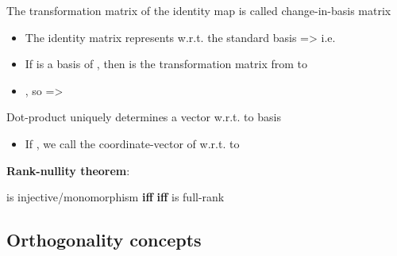 \hSep %

The transformation matrix of the identity map is called
change-in-basis matrix

\begin{itemize}

      \item
            The identity matrix  represents
             w.r.t. the standard
            basis
            => i.e.~
      \item
            If 
            is a basis of , then
             is
            the transformation matrix from  to 
      \item
            , so =>
\end{itemize}

\hSep %

Dot-product uniquely determines a vector w.r.t. to basis
\begin{itemize}

      \item
            If , we call  the
            coordinate-vector of  w.r.t. to 
\end{itemize}

\textbf{Rank-nullity theorem}:

 is injective/monomorphism \textbf{iff}
 \textbf{iff}  is full-rank

\subsection*{Orthogonality concepts}

